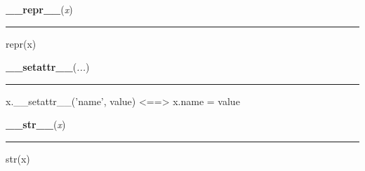     \label{object:__repr__}

    \vspace{0.5ex}

    \begin{boxedminipage}{\textwidth}

    \raggedright \textbf{\_\_repr\_\_}(\textit{x})

    \vspace{-1.5ex}

    \rule{\textwidth}{0.5\fboxrule}

repr(x)
    \vspace{1ex}

    \end{boxedminipage}

    \label{object:__setattr__}

    \vspace{0.5ex}

    \begin{boxedminipage}{\textwidth}

    \raggedright \textbf{\_\_setattr\_\_}(\textit{...})

    \vspace{-1.5ex}

    \rule{\textwidth}{0.5\fboxrule}

x.{\_}{\_}setattr{\_}{\_}('name', value) {\textless}=={\textgreater} x.name = value
    \vspace{1ex}

    \end{boxedminipage}

    \label{object:__str__}

    \vspace{0.5ex}

    \begin{boxedminipage}{\textwidth}

    \raggedright \textbf{\_\_str\_\_}(\textit{x})

    \vspace{-1.5ex}

    \rule{\textwidth}{0.5\fboxrule}

str(x)
    \vspace{1ex}

    \end{boxedminipage}

    \label{peach:optm:optm:Optimizer:step}

